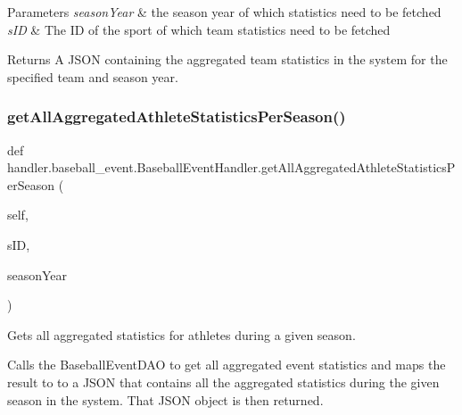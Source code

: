 \begin{DoxyParams}{Parameters}
{\em season\+Year} & the season year of which statistics need to be fetched \\
\hline
{\em s\+ID} & The ID of the sport of which team statistics need to be fetched\\
\hline
\end{DoxyParams}
\begin{DoxyReturn}{Returns}
A J\+S\+ON containing the aggregated team statistics in the system for the specified team and season year. 
\end{DoxyReturn}
\mbox{\label{classhandler_1_1baseball__event_1_1_baseball_event_handler_afb792b9f57594ce09c7c712dac3456a5}} 
\subsubsection{\texorpdfstring{get\+All\+Aggregated\+Athlete\+Statistics\+Per\+Season()}{getAllAggregatedAthleteStatisticsPerSeason()}}
{\footnotesize\ttfamily def handler.\+baseball\+\_\+event.\+Baseball\+Event\+Handler.\+get\+All\+Aggregated\+Athlete\+Statistics\+Per\+Season (\begin{DoxyParamCaption}\item[{}]{self,  }\item[{}]{s\+ID,  }\item[{}]{season\+Year }\end{DoxyParamCaption})}



Gets all aggregated statistics for athletes during a given season. 

Calls the Baseball\+Event\+D\+AO to get all aggregated event statistics and maps the result to to a J\+S\+ON that contains all the aggregated statistics during the given season in the system. That J\+S\+ON object is then returned.


